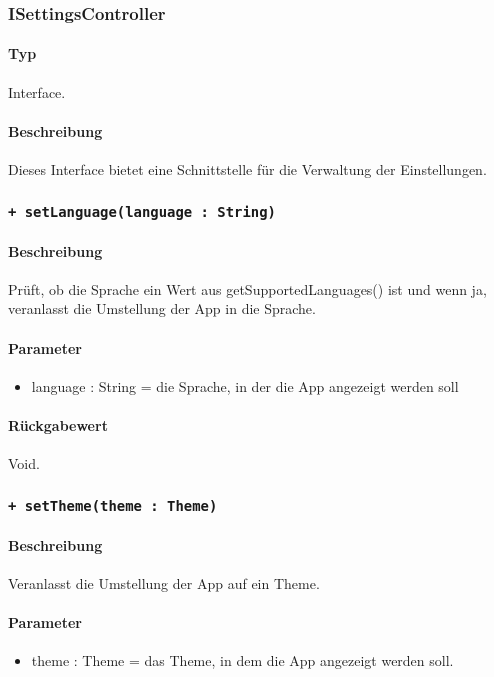 \subsubsection{ISettingsController}
\paragraph*{Typ}
Interface.
\paragraph*{Beschreibung}
Dieses Interface bietet eine Schnittstelle für die Verwaltung der Einstellungen.

\subsubsection*{\texttt{+ setLanguage(language : String)}}%
\paragraph*{Beschreibung}
Prüft, ob die Sprache ein Wert aus getSupportedLanguages() ist und wenn ja, veranlasst die Umstellung der App in die Sprache.
\paragraph*{Parameter}
\begin{itemize}
    \item language : String = die Sprache, in der die App angezeigt werden soll
\end{itemize}
\paragraph*{Rückgabewert}
Void.

\subsubsection*{\texttt{+ setTheme(theme : Theme)}}%
\paragraph*{Beschreibung}
Veranlasst die Umstellung der App auf ein Theme.
\paragraph*{Parameter}
\begin{itemize}
    \item theme : Theme = das Theme, in dem die App angezeigt werden soll.
\end{itemize}
